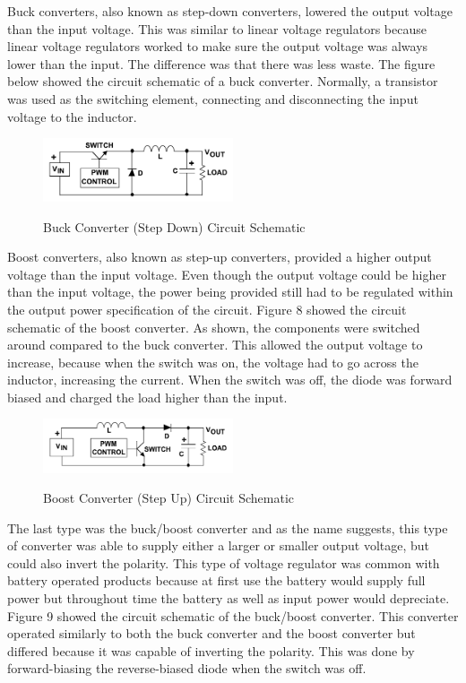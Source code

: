 Buck converters, also known as step-down converters, lowered the output voltage than the input voltage. This was similar to linear voltage regulators because linear voltage regulators worked to make sure the output voltage was always lower than the input. The difference was that there was less waste. The figure below showed the circuit schematic of a buck converter. Normally, a transistor was used as the switching element, connecting and disconnecting the input voltage to the inductor.
\begin{figure}[H]
    \caption{Buck Converter (Step Down) Circuit Schematic}
    \centering
    \includegraphics[width=0.5\textwidth]{images/Buck_Converter.png}
    \label{fig:buck-converter-schematic}
\end{figure}
Boost converters, also known as step-up converters, provided a higher output voltage than the input voltage. Even though the output voltage could be higher than the input voltage, the power being provided still had to be regulated within the output power specification of the circuit. Figure 8 showed the circuit schematic of the boost converter. As shown, the components were switched around compared to the buck converter. This allowed the output voltage to increase, because when the switch was on, the voltage had to go across the inductor, increasing the current. When the switch was off, the diode was forward biased and charged the load higher than the input.
\begin{figure}[H]
    \caption{Boost Converter (Step Up) Circuit Schematic}
    \centering
    \includegraphics[width=0.5\textwidth]{images/Boost_Converter.png}
    \label{fig:boost-converter-schematic}
\end{figure}
The last type was the buck/boost converter and as the name suggests, this type of converter was able to supply either a larger or smaller output voltage, but could also invert the polarity. This type of voltage regulator was common with battery operated products because at first use the battery would supply full power but throughout time the battery as well as input power would depreciate. Figure 9 showed the circuit schematic of the buck/boost converter. This converter operated similarly to both the buck converter and the boost converter but differed because it was capable of inverting the polarity. This was done by forward-biasing the reverse-biased diode when the switch was off.
